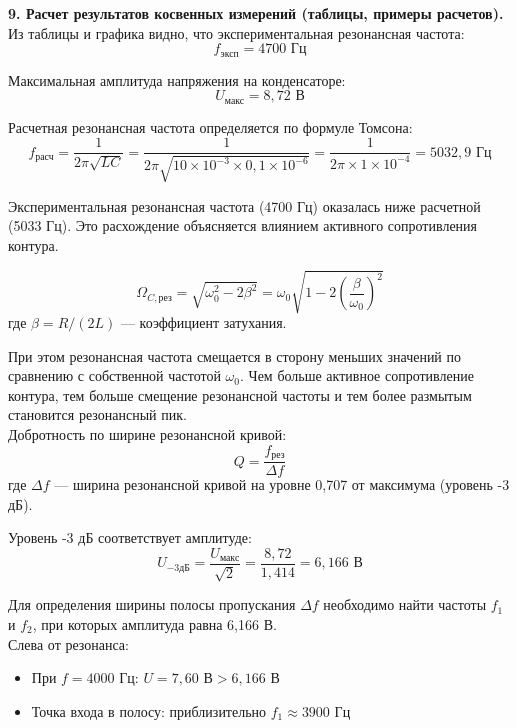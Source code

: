 \documentclass[12pt,fleqn]{article}
\begin{document}
\begin{justify}
    \textbf{9. Расчет результатов косвенных измерений (таблицы, примеры расчетов).} \\

    Из таблицы и графика видно, что экспериментальная резонансная частота:
    \[ f_{\text{эксп}} = 4700 \text{ Гц} \]

    Максимальная амплитуда напряжения на конденсаторе:
    \[ U_{\text{макс}} = 8{,}72 \text{ В} \]

    Расчетная резонансная частота определяется по формуле Томсона:
    \[ f_{\text{расч}} = \frac{1}{2\pi\sqrt{LC}} = \frac{1}{2\pi\sqrt{10 \times 10^{-3} \times 0{,}1 \times 10^{-6}}} = \frac{1}{2\pi \times 1 \times 10^{-4}} = 5032{,}9 \text{ Гц} \]

    Экспериментальная резонансная частота (4700 Гц) оказалась ниже расчетной (5033 Гц). Это расхождение объясняется влиянием активного сопротивления контура.

    \[ \Omega_{C,\text{рез}} = \sqrt{\omega_0^2 - 2\beta^2} = \omega_0\sqrt{1 - 2\left(\frac{\beta}{\omega_0}\right)^2} \]
    где $\beta = R/(2L)$ — коэффициент затухания.

    При этом резонансная частота смещается в сторону меньших значений по сравнению с собственной частотой $\omega_0$. Чем больше активное сопротивление контура, тем больше смещение резонансной частоты и тем более размытым становится резонансный пик. \\
    Добротность по ширине резонансной кривой:
    \[ Q = \frac{f_{\text{рез}}}{\Delta f} \]
    где $\Delta f$ — ширина резонансной кривой на уровне 0,707 от максимума (уровень -3 дБ).

    Уровень -3 дБ соответствует амплитуде:
    \[ U_{-3\text{дБ}} = \frac{U_{\text{макс}}}{\sqrt{2}} = \frac{8{,}72}{1{,}414} = 6{,}166 \text{ В} \]

    Для определения ширины полосы пропускания $\Delta f$ необходимо найти частоты $f_1$ и $f_2$, при которых амплитуда равна 6,166 В. \\
    Слева от резонанса:
    \begin{itemize}
        \item При $f = 4000 \text{ Гц}$: $U = 7{,}60 \text{ В} > 6{,}166 \text{ В}$
        \item Точка входа в полосу: приблизительно $f_1 \approx 3900 \text{ Гц}$
    \end{itemize}


\end{justify}
\end{document}
